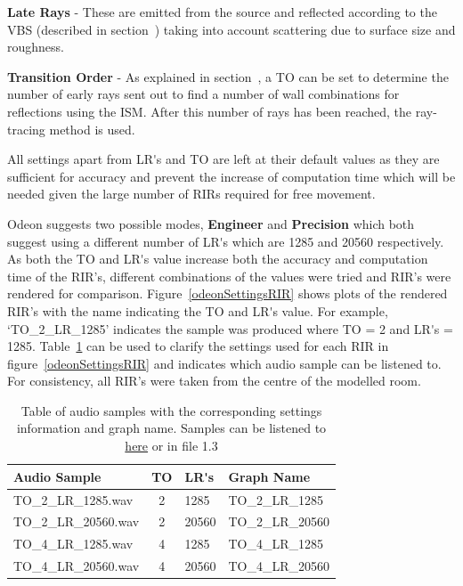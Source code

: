 \documentclass[../../main.tex]{subfiles}
\begin{document}
				\textbf{Late Rays} - These are emitted from the source and reflected according to the \ac{VBS} (described in section~) taking into account scattering due to surface size and roughness.

				\textbf{Transition Order} - As explained in section~, a \ac{TO} can be set to determine the number of early rays sent out to find a number of wall combinations for reflections using the \ac{ISM}. After this number of rays has been reached, the ray-tracing method is used.

				All settings apart from \ac{LR's} and \ac{TO} are left at their default values as they are sufficient for accuracy and prevent the increase of computation time which will be needed given the large number of RIRs required for free movement.

				Odeon suggests two possible modes, \textbf{Engineer} and \textbf{Precision} which both suggest using a different number of \ac{LR's} which are 1285 and 20560 respectively. As both the \ac{TO} and \ac{LR's} value increase both the accuracy and computation time of the \ac{RIR}'s, different combinations of the values were tried and \ac{RIR}'s were rendered for comparison. Figure~\ref{odeonSettingsRIR} shows plots of the rendered \ac{RIR}'s with the name indicating the \ac{TO} and \ac{LR's} value. For example, `TO\_2\_LR\_1285' indicates the sample was produced where \ac{TO} = 2 and \ac{LR's} = 1285. Table~\ref{odeonSettingsTable} can be used to clarify the settings used for each \ac{RIR} in figure~\ref{odeonSettingsRIR} and indicates which audio sample can be listened to. For consistency, all \ac{RIR}'s were taken from the centre of the modelled room.

				\begin{table}
				\begin{center}
					\begin{tabular}{|l | c | l | l|}
					\hline
					\textbf{Audio Sample} & \textbf{\ac{TO}} & \textbf{\ac{LR's}} & \textbf{Graph Name}\\ \hline
					TO\_2\_LR\_1285.wav & 2 & 1285 & TO\_2\_LR\_1285 \\
					TO\_2\_LR\_20560.wav & 2 & 20560 & TO\_2\_LR\_20560 \\
					TO\_4\_LR\_1285.wav & 4 & 1285 & TO\_4\_LR\_1285\\
					TO\_4\_LR\_20560.wav & 4 & 20560 & TO\_4\_LR\_20560 \\ \hline
					\end{tabular}
				\end{center}
				\caption{Table of audio samples with the corresponding settings information and graph name. Samples can be listened to \href{http://lt669.github.io/pages/audioSamples.html}{here} or in file 1.3}
				\label{odeonSettingsTable}
				\end{table}
\end{document}
